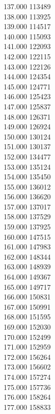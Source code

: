 { 137.000	113489 \\
 138.000	113925 \\
 139.000	114517 \\
 140.000	115093 \\
 141.000	122093 \\
 142.000	122115 \\
 143.000	122126 \\
 144.000	124354 \\
 145.000	124771 \\
 146.000	125423 \\
 147.000	125837 \\
 148.000	126371 \\
 149.000	126924 \\
 150.000	130124 \\
 151.000	130137 \\
 152.000	134477 \\
 153.000	135124 \\
 154.000	135450 \\
 155.000	136012 \\
 156.000	136620 \\
 157.000	137017 \\
 158.000	137529 \\
 159.000	137925 \\
 160.000	147515 \\
 161.000	147983 \\
 162.000	148344 \\
 163.000	148939 \\
 164.000	149367 \\
 165.000	149717 \\
 166.000	150831 \\
 167.000	150991 \\
 168.000	151595 \\
 169.000	152030 \\
 170.000	152499 \\
 171.000	152959 \\
 172.000	156264 \\
 173.000	156602 \\
 174.000	157274 \\
 175.000	157736 \\
 176.000	158264 \\
 177.000	158833 \\
}
